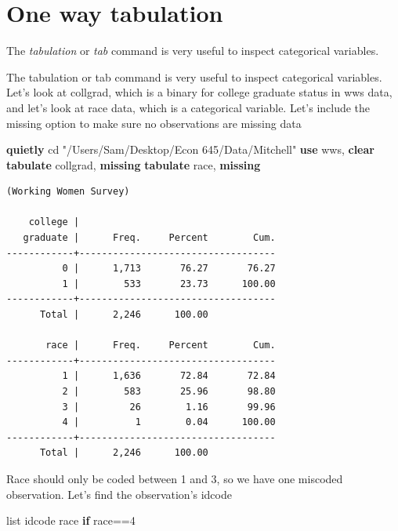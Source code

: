 \documentclass[
]{book}
\newenvironment{Shaded}{\begin{snugshade}}{\end{snugshade}}
\newcommand{\FunctionTok}[1]{\textcolor[rgb]{0.13,0.29,0.53}{\textbf{#1}}}
\newcommand{\KeywordTok}[1]{\textcolor[rgb]{0.13,0.29,0.53}{\textbf{#1}}}
\newcommand{\NormalTok}[1]{#1}
\newcommand{\OtherTok}[1]{\textcolor[rgb]{0.56,0.35,0.01}{#1}}
\newcommand{\StringTok}[1]{\textcolor[rgb]{0.31,0.60,0.02}{#1}}
\begin{document}
\section{One way tabulation}\label{one-way-tabulation}

The \emph{tabulation} or \emph{tab} command is very useful to inspect categorical variables.

The tabulation or tab command is very useful to inspect categorical variables.
Let's look at collgrad, which is a binary for college graduate status in wws data, and let's look at race data, which is a categorical variable. Let's include the missing option to make sure no observations are missing data

\begin{Shaded}
\begin{Highlighting}[]
\KeywordTok{quietly}\NormalTok{ cd }\StringTok{"/Users/Sam/Desktop/Econ 645/Data/Mitchell"}
\KeywordTok{use}\NormalTok{ wws, }\KeywordTok{clear}
\KeywordTok{tabulate}\NormalTok{ collgrad, }\FunctionTok{missing}
\KeywordTok{tabulate}\NormalTok{ race, }\FunctionTok{missing}
\end{Highlighting}
\end{Shaded}

\begin{verbatim}
(Working Women Survey)

    college |
   graduate |      Freq.     Percent        Cum.
------------+-----------------------------------
          0 |      1,713       76.27       76.27
          1 |        533       23.73      100.00
------------+-----------------------------------
      Total |      2,246      100.00

       race |      Freq.     Percent        Cum.
------------+-----------------------------------
          1 |      1,636       72.84       72.84
          2 |        583       25.96       98.80
          3 |         26        1.16       99.96
          4 |          1        0.04      100.00
------------+-----------------------------------
      Total |      2,246      100.00
\end{verbatim}

Race should only be coded between 1 and 3, so we have one miscoded observation.
Let's find the observation's idcode

\begin{Shaded}
\begin{Highlighting}[]
\OtherTok{list}\NormalTok{ idcode race }\KeywordTok{if}\NormalTok{ race==4}
\end{Highlighting}
\end{Shaded}
\end{document}
